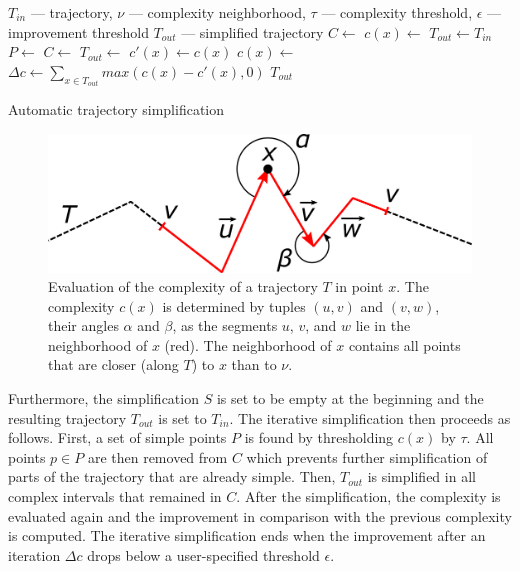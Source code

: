 \begin{algorithm} [htb]
  \begin{algorithmic}[1]
	  \Require $T_{in}$ --- trajectory, $\nu$ --- complexity neighborhood, $\tau$ --- complexity threshold, $\epsilon$ --- improvement threshold
	  \Ensure $T_{out}$ --- simplified trajectory
			\State $C \gets$  
			\State $c(x) \gets$ 
			\State
			\State $T_{out} \gets T_{in}$
			\Repeat
			  \State $P \gets$ 
				\State $C \gets$ 
			  \State
					\State $T_{out} \gets$ 
			  \EndFor
				\State
				\State $c'(x) \gets c(x)$ %
				\State $c(x) \gets$ 
				\State
				\State $\Delta c \gets \sum_{x \in T_{out}}{max(c(x) - c'(x), 0)}$
				\State {}
			\State
			\State \Return $T_{out}$
		\EndProcedure
  \end{algorithmic}
	\caption{Automatic trajectory simplification}
  \label{alg:auto-simplify}
\end{algorithm}

\begin{figure}
	\includegraphics[width=0.95\linewidth]{img/complexity.png}
\caption{Evaluation of the complexity of a trajectory $T$ in point $x$.
The complexity $c(x)$ is determined by tuples $(u, v)$ and $(v, w)$, \ie their angles $\alpha$ and $\beta$, as the segments $u$, $v$, and $w$ lie in the neighborhood of $x$ (red).
The neighborhood of $x$ contains all points that are closer (along $T$) to $x$ than to $\nu$.}
\label{fig:complexity}
\end{figure}

Furthermore, the simplification $S$ is set to be empty at the beginning and the resulting trajectory $T_{out}$ is set to $T_{in}$.
The iterative simplification then proceeds as follows.
First, a set of simple points $P$ is found by thresholding $c(x)$ by $\tau$.
All points $p \in P$ are then removed from $C$ which prevents further simplification of parts of the trajectory that are already simple.
Then, $T_{out}$ is simplified in all complex intervals that remained in $C$.
After the simplification, the complexity is evaluated again and the improvement in comparison with the previous complexity is computed.
The iterative simplification ends when the improvement after an iteration $\Delta c$ drops below a user-specified threshold $\epsilon$.